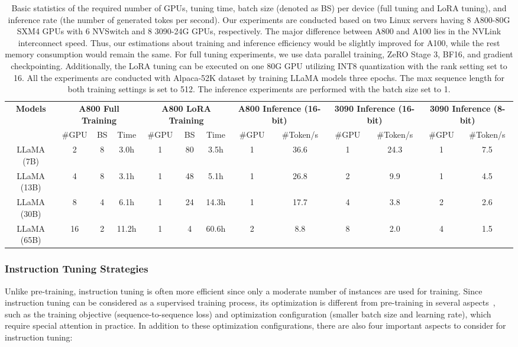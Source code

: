 \begin{table}[t]
    \centering
    \caption{Basic statistics of the required number of GPUs, tuning time, batch size (denoted as BS) per device (full tuning and LoRA tuning), and inference rate (the number of generated tokes per second). Our experiments are conducted based on two Linux servers having 8 A800-80G SXM4 GPUs with 6 NVSwitch and 8 3090-24G GPUs, respectively. {The major difference between A800 and A100 lies in the NVLink interconnect speed. Thus, our estimations about training and inference efficiency would be slightly improved for A100, while the rest memory consumption would remain the same.}  
    {
    For full tuning experiments, we use data parallel training, ZeRO Stage 3, BF16, and gradient checkpointing. Additionally, the LoRA tuning can be executed on one 80G GPU utilizing INT8 quantization with the rank setting set to 16. {All the experiments are conducted with Alpaca-52K dataset by  training LLaMA models three epochs.} The max sequence length for both training settings is set to 512. The inference experiments are performed with the batch size set to 1.}
    }
    \renewcommand\tabcolsep{2.5pt}
    \begin{tabular}{c|ccc|ccc|cc|cc|cc}
    \toprule
    \multirow{2}{*}{\textbf{Models}} & \multicolumn{3}{c|}{\textbf{A800 Full Training}} & \multicolumn{3}{c|}{\textbf{A800 LoRA Training}} & \multicolumn{2}{c|}{\textbf{A800 Inference (16-bit)}} & \multicolumn{2}{c|}{\textbf{3090 Inference (16-bit)}} & \multicolumn{2}{c}{\textbf{3090 Inference (8-bit)}} \\
    & \#GPU & BS & Time & \#GPU & BS & Time & \#GPU & \#Token/s & \#GPU & \#Token/s & \#GPU & \#Token/s \\
    \midrule
    LLaMA (7B)  &  2 & 8 & 3.0h  &  1 & 80 & 3.5h  & 1 & 36.6 & 1 & 24.3 & 1 & 7.5 \\
    LLaMA (13B) &  4 & 8 & 3.1h  &  1 & 48 & 5.1h  & 1 & 26.8 & 2 & 9.9  & 1 & 4.5 \\
    LLaMA (30B) &  8 & 4 & 6.1h  &  1 & 24 & 14.3h & 1 & 17.7 & 4 & 3.8  & 2 & 2.6 \\
    LLaMA (65B) & 16 & 2 & 11.2h &  1 & 4  & 60.6h & 2 & 8.8  & 8 & 2.0  & 4 & 1.5  \\
    \bottomrule
    \end{tabular}
    \label{tab:instruction-time}
\end{table}

\subsubsection{Instruction Tuning Strategies}
\label{sec-ituning-strategy}
Unlike pre-training, instruction tuning is often more efficient since only a moderate number of instances are used for training. 
Since instruction tuning can be considered as a supervised training process, its optimization is different from  pre-training in several aspects~\cite{Chung-arxiv-2022-Scaling},   
{such as the training objective (\ie sequence-to-sequence loss) and optimization configuration (\eg smaller batch size and learning rate)}, which require special attention in practice. 
In addition to these  optimization configurations, there are also four important aspects to consider  for instruction tuning:


